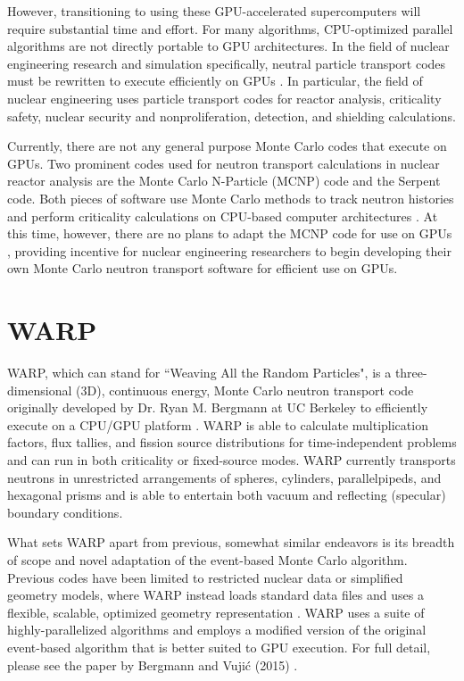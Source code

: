 However, transitioning to using these GPU-accelerated supercomputers will require substantial time
and effort. For many algorithms, CPU-optimized parallel algorithms are not directly portable to GPU 
architectures. In the field of nuclear engineering research and simulation specifically, neutral particle
transport codes must be rewritten to execute efficiently on GPUs \cite{warp2015}. In particular, the field
of nuclear engineering uses particle transport codes for reactor analysis, criticality safety, nuclear 
security and nonproliferation, detection, and shielding calculations.

Currently, there are not any general purpose Monte Carlo codes that execute on GPUs.
Two prominent codes used for neutron transport calculations in nuclear reactor analysis are the Monte
Carlo N-Particle (MCNP) code and the Serpent code. Both pieces of software use Monte Carlo methods to 
track neutron histories and perform criticality calculations on CPU-based computer architectures 
\cite{mcnp, serp_man}. At this time, however, there are no plans to adapt the MCNP code for use on GPUs
\cite{mcnp_nogpu}, providing incentive for nuclear engineering researchers to begin developing their own
Monte Carlo neutron transport software for efficient use on GPUs.

\section{WARP}

WARP, which can stand for ``Weaving All the Random Particles", is a three-dimensional (3D), continuous 
energy, Monte Carlo neutron transport code originally developed by Dr. Ryan M. Bergmann at UC Berkeley to 
efficiently execute on a CPU/GPU platform \cite{warp2015}. WARP is able to calculate multiplication 
factors, flux tallies, and fission source distributions for time-independent problems and can run in both 
criticality or fixed-source modes. WARP currently transports neutrons in unrestricted arrangements of 
spheres, cylinders, parallelpipeds, and hexagonal prisms \cite{warp2015} and is able to entertain both 
vacuum and reflecting (specular) boundary conditions.

What sets WARP apart from previous, somewhat similar endeavors is its breadth of scope and novel 
adaptation of the event-based Monte Carlo algorithm. Previous codes have been limited to restricted 
nuclear data or simplified geometry models, where WARP instead loads standard data files and uses a 
flexible, scalable, optimized geometry representation \cite{warp2015}. WARP uses a suite of 
highly-parallelized algorithms and employs a modified version of the original event-based algorithm that 
is better suited to GPU execution. For full detail, please see the paper by Bergmann and Vuji{\'c} (2015) 
\cite{warp2015}.
